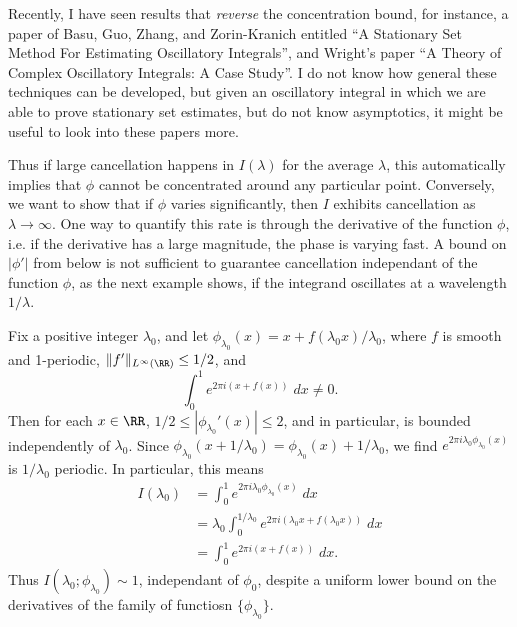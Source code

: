 \begin{remark}
    Recently, I have seen results that \emph{reverse} the concentration bound, for instance, a paper of Basu, Guo, Zhang, and Zorin-Kranich entitled ``A Stationary Set Method For Estimating Oscillatory Integrals'', and Wright's paper ``A Theory of Complex Oscillatory Integrals: A Case Study''. I do not know how general these techniques can be developed, but given an oscillatory integral in which we are able to prove stationary set estimates, but do not know asymptotics, it might be useful to look into these papers more.
\end{remark}

Thus if large cancellation happens in $I(\lambda)$ for the average $\lambda$, this automatically implies that $\phi$ cannot be concentrated around any particular point.  Conversely, we want to show that if $\phi$ varies significantly, then $I$ exhibits cancellation as $\lambda \to \infty$. One way to quantify this rate is through the derivative of the function $\phi$, i.e. if the derivative has a large magnitude, the phase is varying fast. A bound on $|\phi'|$ from below is not sufficient to guarantee cancellation independant of the function $\phi$, as the next example shows, if the integrand oscillates at a wavelength $1/\lambda$.

\begin{example}
  Fix a positive integer $\lambda_0$, and let $\phi_{\lambda_0}(x) = x + f(\lambda_0 x) / \lambda_0$, where $f$ is smooth and 1-periodic, $\| f' \|_{L^\infty(\RR)} \leq 1/2$, and
  \[ \int_0^1 e^{2 \pi i (x + f(x))}\; dx \neq 0. \]
  Then for each $x \in \RR$, $1/2 \leq |\phi_{\lambda_0}'(x)| \leq 2$, and in particular, is bounded independently of $\lambda_0$. Since $\phi_{\lambda_0}(x + 1/\lambda_0) = \phi_{\lambda_0}(x) + 1 / \lambda_0$, we find $e^{2 \pi i \lambda_0 \phi_{\lambda_0}(x)}$ is $1/\lambda_0$ periodic. In particular, this means
  \begin{align*}
    I(\lambda_0) &= \int_0^1 e^{2 \pi i \lambda_0 \phi_{\lambda_0}(x)}\; dx\\
    &= \lambda_0 \int_0^{1/\lambda_0} e^{2 \pi i (\lambda_0 x + f(\lambda_0 x))}\; dx\\
    &= \int_0^1 e^{2 \pi i (x + f(x))}\; dx.
  \end{align*}
  Thus $I(\lambda_0;\phi_{\lambda_0}) \sim 1$, independant of $\phi_0$, despite a uniform lower bound on the derivatives of the family of functiosn $\{ \phi_{\lambda_0} \}$.
\end{example}

